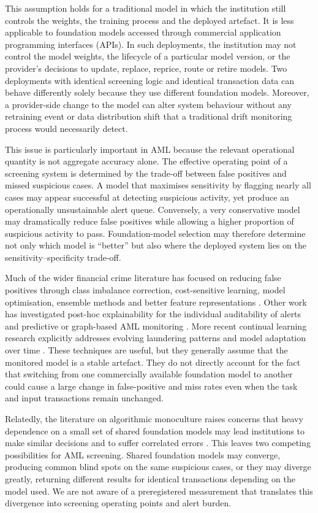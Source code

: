 \documentclass[pdflatex,sn-basic,Numbered]{sn-jnl}
\begin{document}
This assumption holds for a traditional model in which the institution still controls the weights, the training process and the deployed artefact. It is less applicable to foundation models accessed through commercial application programming interfaces (APIs). In such deployments, the institution may not control the model weights, the lifecycle of a particular model version, or the provider's decisions to update, replace, reprice, route or retire models. Two deployments with identical screening logic and identical transaction data can behave differently solely because they use different foundation models. Moreover, a provider-side change to the model can alter system behaviour without any retraining event or data distribution shift that a traditional drift monitoring process would necessarily detect.

This issue is particularly important in AML because the relevant operational quantity is not aggregate accuracy alone. The effective operating point of a screening system is determined by the trade-off between false positives and missed suspicious cases. A model that maximises sensitivity by flagging nearly all cases may appear successful at detecting suspicious activity, yet produce an operationally unsustainable alert queue. Conversely, a very conservative model may dramatically reduce false positives while allowing a higher proportion of suspicious activity to pass. Foundation-model selection may therefore determine not only which model is ``better'' but also where the deployed system lies on the sensitivity--specificity trade-off.

Much of the wider financial crime literature has focused on reducing false positives through class imbalance correction, cost-sensitive learning, model optimisation, ensemble methods and better feature representations \cite{alhashedi,smote,goecks,imbalance}. Other work has investigated post-hoc explainability for the individual auditability of alerts \cite{shap,lime} and predictive or graph-based AML monitoring \cite{jullum,pourhabibi}. More recent continual learning research explicitly addresses evolving laundering patterns and model adaptation over time \cite{deprez}. These techniques are useful, but they generally assume that the monitored model is a stable artefact. They do not directly account for the fact that switching from one commercially available foundation model to another could cause a large change in false-positive and miss rates even when the task and input transactions remain unchanged.

Relatedly, the literature on algorithmic monoculture raises concerns that heavy dependence on a small set of shared foundation models may lead institutions to make similar decisions and to suffer correlated errors \cite{homogenization,leviathan,monoculture}. This leaves two competing possibilities for AML screening. Shared foundation models may converge, producing common blind spots on the same suspicious cases, or they may diverge greatly, returning different results for identical transactions depending on the model used. We are not aware of a preregistered measurement that translates this divergence into screening operating points and alert burden.
\end{document}
